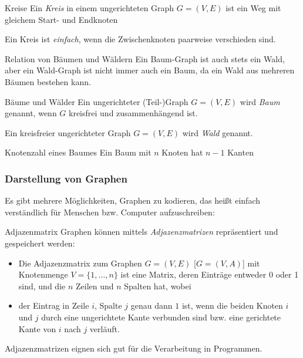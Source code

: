 \documentclass{panikzettel}
\begin{document}

\begin{halfboxl}
	\vspace{-\baselineskip}
	\begin{defi}{Kreise}
		Ein \emph{Kreis} in einem ungerichteten Graph $G=(V,E)$ ist ein Weg mit gleichem Start- und Endknoten
		
		Ein Kreis ist \emph{einfach}, wenn die Zwischenknoten paarweise verschieden sind.
	\end{defi}

	\begin{theo}{Relation von Bäumen und Wäldern}
		Ein Baum-Graph ist auch stets ein Wald, aber ein Wald-Graph ist nicht immer auch ein Baum, da ein Wald aus mehreren Bäumen bestehen kann.
	\end{theo}

	
\end{halfboxl}%
\begin{halfboxr}
	\vspace{-\baselineskip}
	\begin{defi}{Bäume und Wälder}
		Ein ungerichteter (Teil-)Graph $G= (V,E)$ wird \emph{Baum} genannt, wenn $G$ kreisfrei und zusammenhängend ist.
		
		Ein kreisfreier ungerichteter Graph $G=(V,E)$ wird \emph{Wald} genannt.
	\end{defi}

	\begin{theo}{Knotenzahl eines Baumes}
		Ein Baum mit $n$ Knoten hat $n-1$ Kanten
	\end{theo}

	
\end{halfboxr}

\subsubsection{Darstellung von Graphen}

Es gibt mehrere Möglichkeiten, Graphen zu kodieren, das heißt einfach verständlich für Menschen bzw. Computer aufzuschreiben:

	\begin{defi}{Adjazenmatrix}
		Graphen können mittels \emph{Adjazenzmatrizen} repräsentiert und gespeichert werden:
		
		\begin{itemize}
			\item Die Adjazenzmatrix zum Graphen $G = (V,E)$ [$G=(V,A)$] mit Knotenmenge $V= \{1,\dots, n\}$ ist eine Matrix, deren Einträge entweder 0 oder 1 sind, und die $n$ Zeilen und $n$ Spalten hat, wobei
			
			\item der Eintrag in Zeile $i$, Spalte $j$ genau dann $1$ ist, wenn die beiden Knoten $i$ und $j$ durch eine ungerichtete Kante verbunden sind bzw. eine gerichtete Kante von $i$ nach $j$ verläuft.
		\end{itemize}
	
	Adjazenzmatrizen eignen sich gut für die Verarbeitung in Programmen.
	\end{defi}
\end{document}
